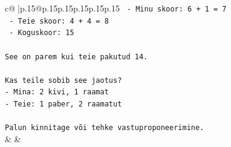 \documentclass{article}
\begin{document}
{\begin{supertabular}{c@{$\;$}|p{.15\linewidth}@{}p{.15\linewidth}p{.15\linewidth}p{.15\linewidth}p{.15\linewidth}p{.15\linewidth}}
{{{\texttt{  {-} Minu skoor: 6 + 1 = 7} \\
\texttt{  {-} Teie skoor: 4 + 4 = 8} \\
\texttt{  {-} Koguskoor: 15} \\
\\ 
\texttt{See on parem kui teie pakutud 14.} \\
\\ 
\texttt{Kas teile sobib see jaotus?} \\
\texttt{{-} Mina: 2 kivi, 1 raamat} \\
\texttt{{-} Teie: 1 paber, 2 raamatut} \\
\\ 
\texttt{Palun kinnitage või tehke vastuproponeerimine.} \\
            }
        }
    }
    & & \\ \\


\end{supertabular}}
\end{document}
